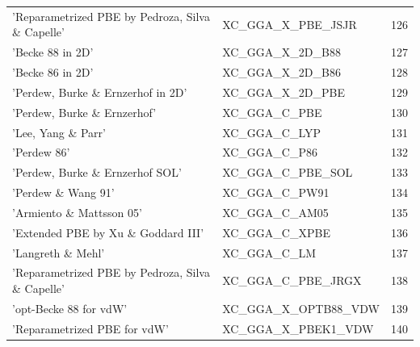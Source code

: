 \documentclass[final,12pt,makeidx,DIV=calc]{article}
\begin{document}
{{{{{{\begin{table}[!h]
\begin{center}
\begin{tabular}{llr}
  'Reparametrized PBE by Pedroza, Silva \& Capelle' & XC\_GGA\_X\_PBE\_JSJR  &126\\
  'Becke 88 in 2D' & XC\_GGA\_X\_2D\_B88  &127\\
  'Becke 86 in 2D' & XC\_GGA\_X\_2D\_B86  &128\\
  'Perdew, Burke \& Ernzerhof in 2D' & XC\_GGA\_X\_2D\_PBE  &129\\
  'Perdew, Burke \& Ernzerhof' & XC\_GGA\_C\_PBE  &130\\
  'Lee, Yang \& Parr' & XC\_GGA\_C\_LYP  &131\\
  'Perdew 86' & XC\_GGA\_C\_P86  &132\\
  'Perdew, Burke \& Ernzerhof SOL' & XC\_GGA\_C\_PBE\_SOL  &133\\
  'Perdew \& Wang 91' & XC\_GGA\_C\_PW91  &134\\
  'Armiento \& Mattsson 05' & XC\_GGA\_C\_AM05  &135\\
  'Extended PBE by Xu \& Goddard III' & XC\_GGA\_C\_XPBE  &136\\
  'Langreth \& Mehl' & XC\_GGA\_C\_LM  &137\\
  'Reparametrized PBE by Pedroza, Silva \& Capelle' & XC\_GGA\_C\_PBE\_JRGX  &138\\
  'opt-Becke 88 for vdW' & XC\_GGA\_X\_OPTB88\_VDW  &139\\
  'Reparametrized PBE for vdW' & XC\_GGA\_X\_PBEK1\_VDW  &140\\
\hline
\hline
\end{tabular}
\end{center}
\end{table}

}}}}}}
\end{document}
